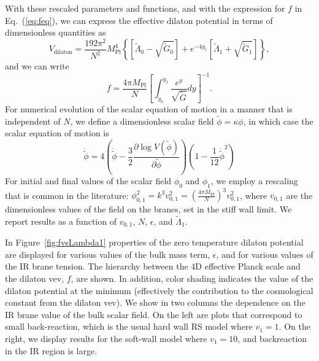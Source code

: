\documentclass[12pt]{article}
\renewcommand{\tilde}{\widetilde} %
\begin{document}
With these rescaled parameters and functions, and with the expression for $f$ in Eq.~(\ref{eq:feq}), we can express the effective dilaton potential in terms of dimensionless quantities as
\begin{equation}
V_\text{dilaton} = \frac{192 \pi^2}{N^2} M_\text{Pl}^4  \left\{ \left[ \tilde{\Lambda}_0 -\sqrt{\tilde{G}_0} \right] + e^{-4 y_1} \left[ \tilde{\Lambda}_1 + \sqrt{\tilde{G}_1} \right] \right\},
\end{equation}
and we can write
\begin{equation}
f = \frac{4 \pi M_\text{Pl}}{N} \left[ \int_{y_0}^{y_1} \frac{e^{y}}{\sqrt{\tilde{G}}} dy \right]^{-1}.
\end{equation}
For numerical evolution of the scalar equation of motion in a manner that is independent of $N$, we define a dimensionless scalar field $\tilde{\phi} = \kappa \phi$, in which case the scalar equation of motion is
\begin{equation}
\ddot{\tilde{\phi}} = 4 \left( \dot{\tilde{\phi}} - \frac{3}{2} \frac{ \partial \log V(\tilde{\phi}) }{\partial \tilde{\phi}} \right) \left( 1 - \frac{1}{12} \dot{\tilde{\phi}}^2 \right)
\end{equation}
For initial and final values of the scalar field $\phi_0$ and $\phi_1$, we employ a rescaling that is common in the literature: $\phi_{0,1}^2 = k^3 v_{0,1}^2 = \left( \frac{4 \pi M_\text{Pl}}{N} \right)^3 v_{0,1}^2$, where $v_{0,1}$ are the dimensionless values of the field on the branes, set in the stiff wall limit.  We report results as a function of $v_{0,1}$, $N$, $\epsilon$, and $\tilde{\Lambda}_1$.

In Figure~\ref{fig:fvsLambda1} properties of the zero temperature dilaton potential are displayed for various values of the bulk mass term, $\epsilon$, and for various values of the IR brane tension.  The hierarchy between the 4D effective Planck scale and the dilaton vev, $f$, are shown.  In addition,  color shading indicates the value of the dilaton potential at the minimum (effectively the contribution to the cosmological constant from the dilaton vev).  We show in two columns the dependence on the IR brane value of the bulk scalar field.  On the left are plots that correspond to small back-reaction, which is the usual hard wall RS model where $v_1 = 1$.  On the right, we display results for the soft-wall model where $v_1 = 10$, and backreaction in the IR region is large.
\end{document}

